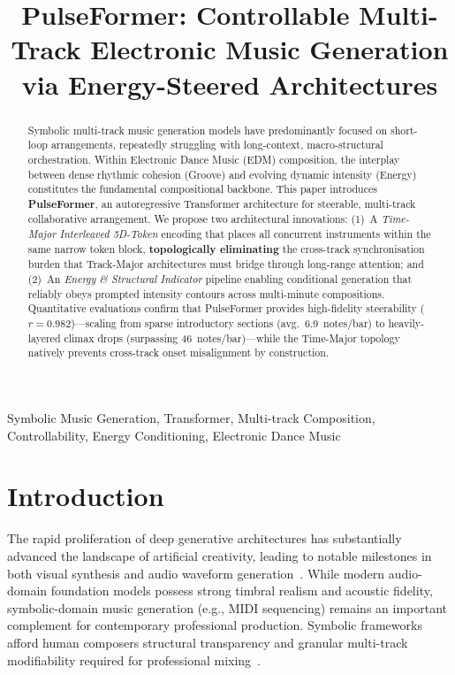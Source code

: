 \documentclass[conference]{IEEEtran}
\begin{document}
\title{PulseFormer: Controllable Multi-Track Electronic Music Generation via Energy-Steered Architectures}

\author{
}

\maketitle

\begin{abstract}
Symbolic multi-track music generation models have predominantly focused on short-loop arrangements, repeatedly struggling with long-context, macro-structural orchestration. Within Electronic Dance Music (EDM) composition, the interplay between dense rhythmic cohesion (Groove) and evolving dynamic intensity (Energy) constitutes the fundamental compositional backbone. This paper introduces \textbf{PulseFormer}, an autoregressive Transformer architecture for steerable, multi-track collaborative arrangement. We propose two architectural innovations: (1)~A \textit{Time-Major Interleaved 5D-Token} encoding that places all concurrent instruments within the same narrow token block, \textbf{topologically eliminating} the cross-track synchronisation burden that Track-Major architectures must bridge through long-range attention; and (2)~An \textit{Energy \& Structural Indicator} pipeline enabling conditional generation that reliably obeys prompted intensity contours across multi-minute compositions. Quantitative evaluations confirm that PulseFormer provides high-fidelity steerability ($r=0.982$)---scaling from sparse introductory sections (avg.\ 6.9~notes/bar) to heavily-layered climax drops (surpassing 46~notes/bar)---while the Time-Major topology natively prevents cross-track onset misalignment by construction.
\end{abstract}

\begin{IEEEkeywords}
Symbolic Music Generation, Transformer, Multi-track Composition, Controllability, Energy Conditioning, Electronic Dance Music
\end{IEEEkeywords}

\section{Introduction}
The rapid proliferation of deep generative architectures has substantially advanced the landscape of artificial creativity, leading to notable milestones in both visual synthesis and audio waveform generation~\cite{dhariwal2020jukebox, donahue2023singsong}. While modern audio-domain foundation models possess strong timbral realism and acoustic fidelity, symbolic-domain music generation (e.g., MIDI sequencing) remains an important complement for contemporary professional production. Symbolic frameworks afford human composers structural transparency and granular multi-track modifiability required for professional mixing~\cite{huang2019music, payne2019musenet, dong2020muspy}.
\end{document}
